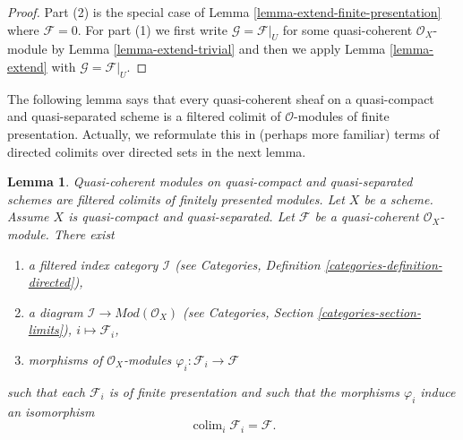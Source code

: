 \documentclass{stacks-project}
\newenvironment{slogan}{\comment}{\endcomment}
\theoremstyle{plain}
\newtheorem{lemma}[subsection]{Lemma}
\theoremstyle{definition}
\theoremstyle{remark}
\numberwithin{equation}{subsection}
\def\colim{\mathop{\mathrm{colim}}\nolimits}
\begin{document}
\begin{proof}
Part (2) is the special case of Lemma \ref{lemma-extend-finite-presentation}
where $\mathcal{F} = 0$. For part (1) we first write
$\mathcal{G} = \mathcal{F}|_U$ for some quasi-coherent $\mathcal{O}_X$-module
by Lemma \ref{lemma-extend-trivial}
and then we apply Lemma \ref{lemma-extend} with $\mathcal{G} = \mathcal{F}|_U$.
\end{proof}

\noindent
The following lemma says that every quasi-coherent sheaf on a quasi-compact
and quasi-separated scheme is a filtered colimit of $\mathcal{O}$-modules
of finite presentation. Actually, we reformulate this in (perhaps more
familiar) terms of directed colimits over directed sets in the next lemma.

\begin{lemma}
\label{lemma-directed-colimit-diagram-finite-presentation}
\begin{slogan}
Quasi-coherent modules on quasi-compact and quasi-separated schemes
are filtered colimits of finitely presented modules.
\end{slogan}
Let $X$ be a scheme. Assume $X$ is quasi-compact and quasi-separated.
Let $\mathcal{F}$ be a quasi-coherent $\mathcal{O}_X$-module.
There exist
\begin{enumerate}
\item a filtered index category $\mathcal{I}$ (see
Categories, Definition \ref{categories-definition-directed}),
\item a diagram $\mathcal{I} \to \textit{Mod}(\mathcal{O}_X)$ (see
Categories, Section \ref{categories-section-limits}),
$i \mapsto \mathcal{F}_i$,
\item morphisms of $\mathcal{O}_X$-modules
$\varphi_i : \mathcal{F}_i \to \mathcal{F}$
\end{enumerate}
such that each $\mathcal{F}_i$ is of finite presentation
and such that the morphisms $\varphi_i$ induce an isomorphism
$$
\colim_i \mathcal{F}_i
=
\mathcal{F}.
$$
\end{lemma}
\end{document}
